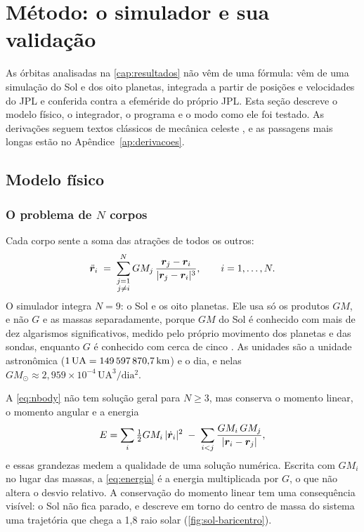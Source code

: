 \section{Método: o simulador e sua validação}\label{sec:metodo}

As órbitas analisadas na \autoref{cap:resultados} não vêm de uma fórmula: vêm de uma simulação do Sol e dos oito planetas, integrada a partir de posições e velocidades do JPL e conferida contra a efeméride do próprio JPL. Esta seção descreve o modelo físico, o integrador, o programa e o modo como ele foi testado. As derivações seguem textos clássicos de mecânica celeste \cite{symon1982,goldstein2002,murray1999,danby1988}, e as passagens mais longas estão no Apêndice~\ref{ap:derivacoes}.

\subsection{Modelo físico}\label{cap:fisica}

\subsubsection{O problema de \texorpdfstring{$N$}{N} corpos}\label{sec:nbody}

Cada corpo sente a soma das atrações de todos os outros:
\begin{equation}
  \ddot{\bm{r}}_i \;=\; \sum_{\substack{j=1\\ j\neq i}}^{N} GM_j\,\frac{\bm{r}_j-\bm{r}_i}{|\bm{r}_j-\bm{r}_i|^3},
  \qquad i = 1,\dots,N.
  \label{eq:nbody}
\end{equation}
O simulador integra $N=9$: o Sol e os oito planetas. Ele usa só os produtos $GM$, e não $G$ e as massas separadamente, porque $GM$ do Sol é conhecido com mais de dez algarismos significativos, medido pelo próprio movimento dos planetas e das sondas, enquanto $G$ é conhecido com cerca de cinco \cite{park2021}. As unidades são a unidade astronômica ($1\,\mathrm{UA} = 149\,597\,870{,}7\,\mathrm{km}$) e o dia, e nelas $GM_\odot \approx 2{,}959\times10^{-4}\,\mathrm{UA^3/dia^2}$.

A \autoref{eq:nbody} não tem solução geral para $N\geq3$, mas conserva o momento linear, o momento angular e a energia
\begin{equation}
  E = \sum_i \tfrac12 GM_i\,|\dot{\bm{r}}_i|^2 \;-\; \sum_{i<j}\frac{GM_i\,GM_j}{|\bm{r}_i-\bm{r}_j|},
  \label{eq:energia}
\end{equation}
e essas grandezas medem a qualidade de uma solução numérica. Escrita com $GM_i$ no lugar das massas, a \autoref{eq:energia} é a energia multiplicada por $G$, o que não altera o desvio relativo. A conservação do momento linear tem uma consequência visível: o Sol não fica parado, e descreve em torno do centro de massa do sistema uma trajetória que chega a 1,8 raio solar (\autoref{fig:sol-baricentro}).

